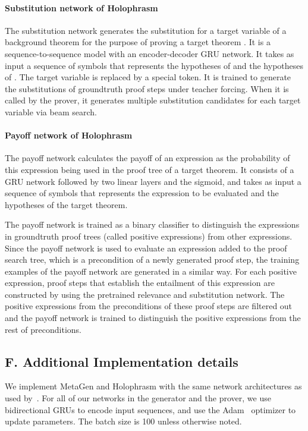 \documentclass{article}
\begin{document}
\paragraph{Substitution network of Holophrasm}
The substitution network 
generates the substitution for a target variable 
of a background theorem  
for the purpose of proving a target theorem .
It is a sequence-to-sequence model
with an encoder-decoder GRU network.
It takes as input a sequence of symbols 
that represents
 the hypotheses of 
and the hypotheses of 
. The target variable is replaced by 
a special token.
It is trained to generate the substitutions of groundtruth proof steps under teacher forcing.
When it is called by the prover, it 
generates multiple substitution candidates for each target variable via beam search.

\paragraph{Payoff network of Holophrasm}
The payoff network calculates the payoff of an expression as  
the probability 
of this expression being used in the proof tree of a target theorem.
It consists of a GRU network
followed by two linear layers and the sigmoid,
and takes as input a sequence of symbols that represents the 
expression to be evaluated and the hypotheses of the target theorem.

The payoff network is trained as a binary classifier to distinguish the expressions in groundtruth proof trees (called positive expressions)
from other expressions. 
Since the payoff network is used to evaluate an expression added to the proof search tree, which is a precondition of a newly generated proof step, 
the training examples of the payoff network are generated in a similar way.
For each positive expression,
 proof steps 
that establish the entailment of this expression are constructed 
by using the pretrained relevance and substitution network.
The positive expressions from the preconditions of these proof steps are filtered out  
and the payoff network is trained to distinguish the positive expressions from the rest of preconditions.

\subsection*{F. Additional Implementation details}
\label{app:detail}

We implement MetaGen and Holophrasm with the same network architectures 
as used by~\cite{whalen2016holophrasm}.
For all of our networks in the generator and the prover, we use bidirectional GRUs to encode input sequences,
and use the Adam~\citep{kingma2014adam} optimizer to update parameters.
The batch size is 100 unless otherwise noted.
\end{document}
